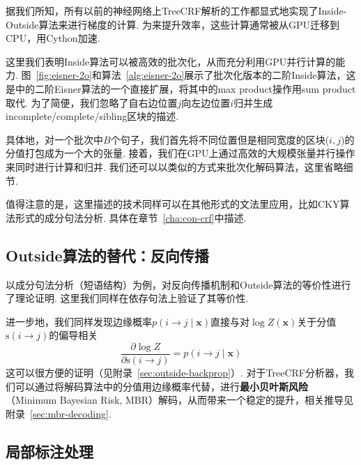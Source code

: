 

据我们所知，所有以前的神经网络上TreeCRF解析的工作都显式地实现了Inside-Outside算法来进行梯度的计算\cite{zhang-etal-2019-empirical, jiang-etal-2018-supervised}.
为来提升效率，这些计算通常被从GPU迁移到CPU，用Cython加速.

这里我们表明Inside算法可以被高效的批次化，从而充分利用GPU并行计算的能力.
图~\ref{fig:eisner-2o}和算法~\ref{alg:eisner-2o}展示了批次化版本的二阶Inside算法，这是\cite{mcdonald-pereira-2006-online}中的二阶Eisner算法的一个直接扩展，将其中的max product操作用sum product取代.
为了简便，我们忽略了自右边位置$j$向左边位置$i$归并生成incomplete/complete/sibling区块的描述.

具体地，对一个批次中$B$个句子，我们首先将不同位置但是相同宽度的区块($i, j$)的分值打包成为一个大的张量.
接着，我们在GPU上通过高效的大规模张量并行操作来同时进行计算和归并.
我们还可以以类似的方式来批次化解码算法，这里省略细节.

值得注意的是，这里描述的技术同样可以在其他形式的文法里应用，比如CKY算法形式的成分句法分析\cite{finkel-etal-2008-efficient,drozdov-etal-2019-unsupervised}.
具体在章节~\ref{cha:con-crf}中描述.

\subsection{Outside算法的替代：反向传播}

\cite{eisner-2016-inside}以成分句法分析（短语结构）为例，对反向传播机制和Outside算法的等价性进行了理论证明.
这里我们同样在依存句法上验证了其等价性.

进一步地，我们同样发现边缘概率$p(i \rightarrow j\mid\boldsymbol{x})$直接与对$\log Z(\boldsymbol{x})$关于分值$\mathrm{s}(i\rightarrow j)$的偏导相关
\begin{equation}
    \label{eq:partial-derivative}
    \frac{\partial \log Z}{\partial \mathrm{s}(i\rightarrow j)} = p(i \rightarrow j\mid\boldsymbol{x})
\end{equation}
这可以很方便的证明（见附录~\ref{sec:outside-backprop}）.
对于TreeCRF分析器，我们可以通过将解码算法中的分值用边缘概率代替，进行\textbf{最小贝叶斯风险}（Minimum Bayesian Risk, MBR）解码\cite{smith-smith-2007-probabilistic}，从而带来一个稳定的提升，相关推导见附录~\ref{sec:mbr-decoding}.

\subsection{局部标注处理}
\label{sub@sec:partial-annotation}

